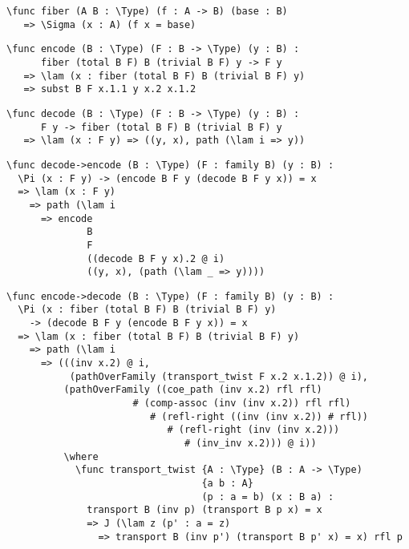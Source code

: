 \begin{ListingEnv}[H]
\begin{lstlisting}
\func fiber (A B : \Type) (f : A -> B) (base : B)
   => \Sigma (x : A) (f x = base)
\end{lstlisting}
\end{ListingEnv}

\begin{ListingEnv}[H]
\begin{lstlisting}
\func encode (B : \Type) (F : B -> \Type) (y : B) :
      fiber (total B F) B (trivial B F) y -> F y
   => \lam (x : fiber (total B F) B (trivial B F) y)
   => subst B F x.1.1 y x.2 x.1.2
\end{lstlisting}
\end{ListingEnv}

\begin{ListingEnv}[H]
\begin{lstlisting}
\func decode (B : \Type) (F : B -> \Type) (y : B) :
      F y -> fiber (total B F) B (trivial B F) y
   => \lam (x : F y) => ((y, x), path (\lam i => y))
\end{lstlisting}
\end{ListingEnv}

\begin{ListingEnv}[H]
\begin{lstlisting}
\func decode->encode (B : \Type) (F : family B) (y : B) :
  \Pi (x : F y) -> (encode B F y (decode B F y x)) = x
  => \lam (x : F y)
    => path (\lam i
      => encode
              B
              F
              ((decode B F y x).2 @ i)
              ((y, x), (path (\lam _ => y))))
\end{lstlisting}
\end{ListingEnv}

\begin{ListingEnv}[H]
\begin{lstlisting}
\func encode->decode (B : \Type) (F : family B) (y : B) :
  \Pi (x : fiber (total B F) B (trivial B F) y)
    -> (decode B F y (encode B F y x)) = x
  => \lam (x : fiber (total B F) B (trivial B F) y)
    => path (\lam i
      => (((inv x.2) @ i,
           (pathOverFamily (transport_twist F x.2 x.1.2)) @ i),
          (pathOverFamily ((coe_path (inv x.2) rfl rfl)
                      # (comp-assoc (inv (inv x.2)) rfl rfl)
                         # (refl-right ((inv (inv x.2)) # rfl))
                            # (refl-right (inv (inv x.2)))
                               # (inv_inv x.2))) @ i))
          \where
            \func transport_twist {A : \Type} (B : A -> \Type)
                                  {a b : A}
                                  (p : a = b) (x : B a) :
              transport B (inv p) (transport B p x) = x
              => J (\lam z (p' : a = z)
                => transport B (inv p') (transport B p' x) = x) rfl p
\end{lstlisting}
\end{ListingEnv}

